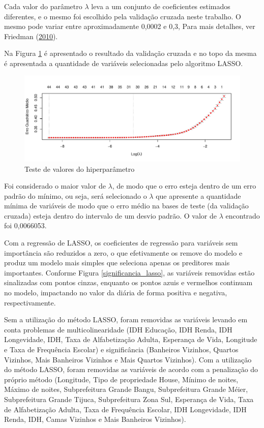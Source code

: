 \documentclass[
	12pt,				%
	a4paper,		%
	oneside,    %
	chapter=TITLE,		   %
	section=TITLE,		   %
	subsection=TITLE,	   %
	subsubsection=TITLE, %
	english,			%
	french,				%
	spanish,			%
	brazil,				%
]{abntex2}
\begin{document}
Cada valor do parâmetro \(\lambda\) leva a um conjunto de coeficientes
estimados diferentes, e o mesmo foi escolhido pela validação cruzada
neste trabalho. O mesmo pode variar entre aproximadamente 0,0002 e 0,3,
Para mais detalhes, ver Friedman
(\protect\hyperlink{ref-friedman2010regularization}{2010}).

Na Figura \ref{lasso_lambda} é apresentado o resultado da validação
cruzada e no topo da mesma é apresentada a quantidade de variáveis
selecionadas pelo algoritmo LASSO.

\begin{figure}
\centering
\includegraphics{00-TCC_files/figure-latex/lasso_lambda-1.pdf}
\caption{\label{lasso_lambda}Teste de valores do hiperparâmetro}
\end{figure}

Foi considerado o maior valor de \(\lambda\), de modo que o erro esteja
dentro de um erro padrão do mínimo, ou seja, será selecionado o
\(\lambda\) que apresente a quantidade mínima de variáveis de modo que o
erro médio na bases de teste (da validação cruzada) esteja dentro do
intervalo de um desvio padrão. O valor de \(\lambda\) encontrado foi
0,0066053.

Com a regressão de LASSO, os coeficientes de regressão para variáveis
sem importância são reduzidos a zero, o que efetivamente os remove do
modelo e produz um modelo mais simples que seleciona apenas os
preditores mais importantes. Conforme Figura \ref{significancia_lasso},
as variáveis removidas estão sinalizadas com pontos cinzas, enquanto os
pontos azuis e vermelhos continuam no modelo, impactando no valor da
diária de forma positiva e negativa, respectivamente.

Sem a utilização do método LASSO, foram removidas as variáveis levando
em conta problemas de multicolinearidade (IDH Educação, IDH Renda, IDH
Longevidade, IDH, Taxa de Alfabetização Adulta, Esperança de Vida,
Longitude e Taxa de Frequência Escolar) e significância (Banheiros
Vizinhos, Quartos Vizinhos, Mais Banheiros Vizinhos e Mais Quartos
Vizinhos). Com a utilização do método LASSO, foram removidas as
variáveis de acordo com a penalização do próprio método (Longitude, Tipo
de propriedade House, Mínimo de noites, Máximo de noites, Subprefeitura
Grande Bangu, Subprefeitura Grande Méier, Subprefeitura Grande Tijuca,
Subprefeitura Zona Sul, Esperança de Vida, Taxa de Alfabetização Adulta,
Taxa de Frequência Escolar, IDH Longevidade, IDH Renda, IDH, Camas
Vizinhos e Mais Banheiros Vizinhos).
\end{document}
